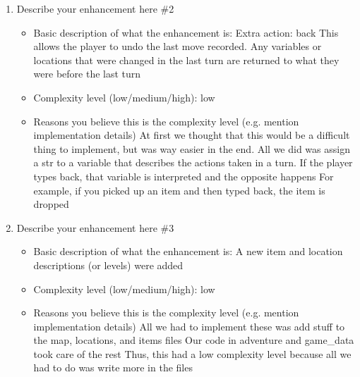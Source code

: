 \documentclass[11pt]{article}
\begin{document}
\begin{enumerate}
\begin{itemize}
	\end{itemize}

\item Describe your enhancement here \#2
	\begin{itemize}
	\item Basic description of what the enhancement is:
	Extra action: back
	This allows the player to undo the last move recorded.
	Any variables or locations that were changed in the last turn are returned to what they were before the last turn
	\item Complexity level (low/medium/high): low
	\item Reasons you believe this is the complexity level (e.g. mention implementation details)
	At first we thought that this would be a difficult thing to implement, but was way easier in the end.
	All we did was assign a str to a variable that describes the actions taken in a turn.
	If the player types back, that variable is interpreted and the opposite happens
	For example, if you picked up an item and then typed back, the item is dropped
	\end{itemize}

\item Describe your enhancement here \#3
	\begin{itemize}
	\item Basic description of what the enhancement is:
	A new item and location descriptions (or levels) were added
	\item Complexity level (low/medium/high): low
	\item Reasons you believe this is the complexity level (e.g. mention implementation details)
	All we had to implement these was add stuff to the map, locations, and items files
	Our code in adventure and game_data took care of the rest
	Thus, this had a low complexity level because all we had to do was write more in the files
	\end{itemize}


\end{enumerate}
\end{document}
